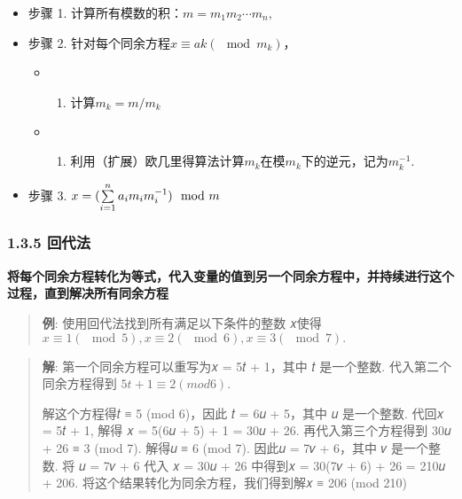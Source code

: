 \begin{itemize}
\tightlist
\item
  步骤 1. \(计算所有模数的积：m = m_1m_2 ⋯ m_n,\)
\item
  步骤 2. \(针对每个同余方程 x \equiv ak (\mod m_k)，\)

  \begin{itemize}
  \tightlist
  \item
    \begin{enumerate}
    \def\labelenumi{\alph{enumi}.}
    \tightlist
    \item
      \(计算 m_k = m/m_k\)
    \end{enumerate}
  \item
    \begin{enumerate}
    \def\labelenumi{\alph{enumi}.}
    \setcounter{enumi}{1}
    \tightlist
    \item
      \(利用（扩展）欧几里得算法计算m_k在模m_k下的逆元，记为m_k^{-1}.\)
    \end{enumerate}
  \end{itemize}
\item
  步骤 3. \(\large x=(\sum\limits_{i=1}^{n} a_im_im_i^{-1} )\mod m\)
\end{itemize}

\subsubsection{1.3.5 回代法}\label{ux56deux4ee3ux6cd5}

\textbf{将每个同余方程转化为等式，代入变量的值到另一个同余方程中，并持续进行这个过程，直到解决所有同余方程}

\begin{quote}
\textbf{例}: 使用回代法找到所有满足以下条件的整数 𝑥使得
\(x \equiv 1 (\mod 5), x \equiv 2 (\mod 6), x \equiv 3 (\mod 7).\)
\end{quote}

\begin{quote}
\textbf{解}: 第一个同余方程可以重写为𝑥 = 5𝑡 + 1，其中 𝑡 是一个整数.
代入第二个同余方程得到 \(5𝑡 + 1 \equiv 2 (mod 6)\).

解这个方程得𝑡 ≡ 5 (mod 6)，因此 𝑡 = 6𝑢 + 5，其中 𝑢 是一个整数. 代回𝑥 =
5𝑡 + 1, 解得 𝑥 = 5(6𝑢 + 5) + 1 = 30𝑢 + 26. 再代入第三个方程得到 30𝑢 + 26
≡ 3 (mod 7). 解得𝑢 ≡ 6 (mod 7). 因此𝑢 = 7𝑣 + 6，其中 𝑣 是一个整数. 将 𝑢
= 7𝑣 + 6 代入 𝑥 = 30𝑢 + 26 中得到𝑥 = 30(7𝑣 + 6) + 26 = 210𝑢 + 206.
将这个结果转化为同余方程，我们得到解𝑥 ≡ 206 (mod 210)
\end{quote}

